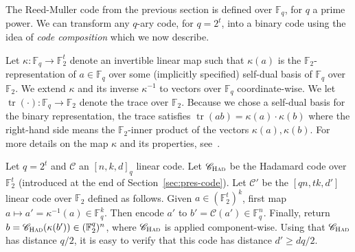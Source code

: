 \documentclass[11pt]{article}
\theoremstyle{definition}
\newcommand{\code}{\mathscr{C}}
\newcommand{\F}{\ensuremath{\mathbb{F}}}
\newcommand{\Had}{\ensuremath{\textsc{Had}}}
\DeclareMathOperator{\tr}{tr}
\begin{document}
 The Reed-Muller code from the previous section is defined over $\F_q$, for $q$ a prime power. We can transform any $q$-ary code, for $q=2^t$, into a binary code using the idea of \emph{code composition} which we now describe. 


Let $\kappa: \F_q \to \F_2^t$ denote an invertible linear map such that $\kappa(a)$ is the $\F_2$-representation of $a \in \F_q$ over some (implicitly specified) self-dual basis of $\F_q$ over $\F_2$. We extend $\kappa$ and its inverse $\kappa^{-1}$ to vectors over $\F_q$ coordinate-wise. We let $\tr(\cdot):\F_q\to\F_2$ denote the trace over $\F_2$. Because we chose a self-dual basis for the binary representation, the trace satisfies $\tr(ab)=\kappa(a)\cdot\kappa(b)$  where the right-hand side means the $\F_2$-inner product of the vectors $\kappa(a), \kappa(b)$. For more details on the map $\kappa$ and its properties, see~\cite[Section 3.3]{ji2020mip}.

Let $q=2^t$ and $\code$ an $[n,k,d]_q$ linear code. Let $\code_{\Had}$ be the Hadamard code over $\F_2^t$ (introduced at the end of Section~\ref{sec:pres-code}). 
Let $\code'$ be the $[qn,tk,d']$ linear code over $\F_2$ defined as follows. Given $a\in (\F_2^t)^{k}$, first map $a\mapsto a'=\kappa^{-1}(a) \in \F_q^{k}$. Then encode $a'$ to $b'=\code(a')\in \F_q^n$. Finally, return $b=\code_\Had(\kappa(b'))\in(\F_2^q)^n$, where $\code_\Had$ is applied component-wise. Using that $\code_\Had$ has distance $q/2$, it is easy to verify that this code has distance $d'\geq dq/2$.
\end{document}
